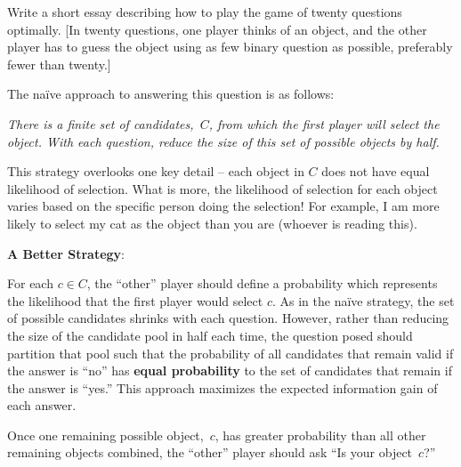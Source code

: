 \newpage
\begin{problem}{5}{24}
  Write a short essay describing how to play the game of twenty questions optimally.  \textnormal{[In twenty questions, one player thinks of an object, and the other player has to guess the object using as few binary question as possible, preferably fewer than twenty.]}
\end{problem}

The na\"ive approach to answering this question is as follows:

\begin{addmargin}[0.5in]{0.5in}
  \textit{There is a finite set of candidates,~$C$, from which the first player will select the object.  With each question, reduce the size of this set of possible objects by half.}
\end{addmargin}

\noindent
This strategy overlooks one key detail -- each object in $C$ does not have equal likelihood of selection.  What is more, the likelihood of selection for each object varies based on the specific person doing the selection!  For example, I am more likely to select my cat as the object than you are (whoever is reading this).

\noindent
\textbf{A Better Strategy}:

For each $c \in C$, the ``other'' player should define a probability which represents the likelihood that the first player would select $c$. As in the na\"ive strategy, the set of possible candidates shrinks with each question.  However, rather than reducing the size of the candidate pool in half each time, the question posed should partition that pool such that the probability of all candidates that remain valid if the answer is ``no'' has \textbf{equal probability} to the set of candidates that remain if the answer is ``yes.''  This approach maximizes the expected information gain of each answer.

Once one remaining possible object,~$c$, has greater probability than all other remaining objects combined, the ``other'' player should ask ``Is your object~$c$?''
